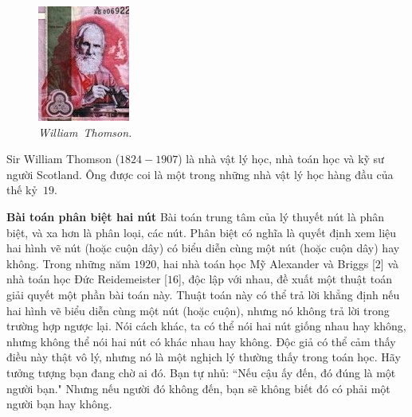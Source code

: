 \begin{multicols}{2}
\begin{tBox}
\begin{figure}
			\vspace*{-15pt}
			\centering
			\captionsetup{labelformat= empty, justification=centering}
			\includegraphics[width= 1.1\linewidth]{fig_William}
			\caption{\small\textit{\color{duongvaotoanhoc}William~Thomson.}}
			\vspace*{-10pt}
		\end{figure}
		Sir William Thomson ($1824-1907$) là nhà vật lý học, nhà toán học và kỹ sư người Scotland. Ông được coi là một trong những nhà vật lý học hàng đầu của thế kỷ~$19$.
	\end{tBox}
	\textbf{\color{duongvaotoanhoc}Bài toán phân biệt hai nút}
	\vskip 0.1cm
	Bài toán trung tâm của lý thuyết nút là phân biệt, và xa hơn là phân loại, các nút. Phân biệt có nghĩa là quyết định xem liệu hai hình vẽ nút (hoặc cuộn dây) có biểu diễn cùng một nút (hoặc cuộn dây) hay không. Trong những năm $1920$, hai nhà toán học Mỹ Alexander và Briggs [$2$] và nhà toán học Đức Reidemeister [$16$], độc lập với nhau, đề xuất một thuật toán giải quyết một phần bài toán này. Thuật toán này có thể trả lời khẳng định nếu hai hình vẽ biểu diễn cùng một nút (hoặc cuộn), nhưng nó không trả lời trong trường hợp ngược lại. Nói cách khác, ta có thể nói hai nút giống nhau hay không, nhưng không thể nói hai nút có khác nhau hay không. Độc giả có thể cảm thấy điều này thật vô lý, nhưng nó là một nghịch lý thường thấy trong toán học. Hãy tưởng tượng bạn đang chờ ai đó. Bạn tự nhủ: ``Nếu cậu ấy đến, đó đúng là một người bạn." Nhưng nếu người đó không đến, bạn sẽ không biết đó có phải một người bạn hay không.

\end{multicols}
